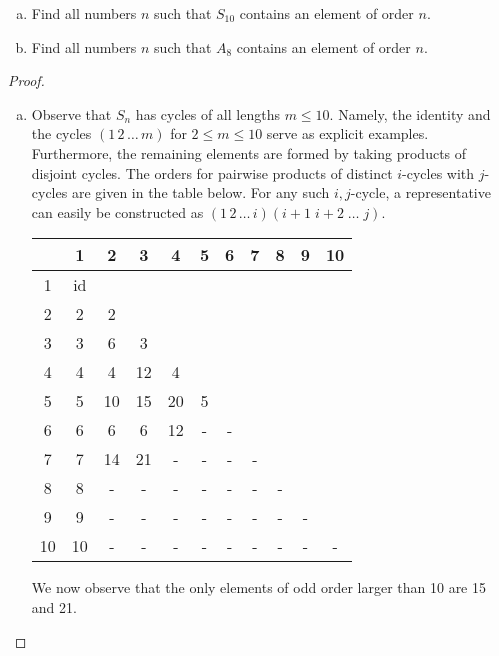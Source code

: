 \documentclass[10pt]{amsart}
\begin{document}
\begin{thm}
  \begin{enumerate}[(a)]
    \item
      Find all numbers $n$ such that $S_{10}$ contains an element of order $n$.
    \item
      Find all numbers $n$ such that $A_8$ contains an element of order $n$.
  \end{enumerate}
  \begin{proof}
    \begin{enumerate}[(a)]
    \item
      Observe that $S_n$ has cycles of all lengths $m \leq 10$.  
      Namely, the identity and the cycles $\left(1 \, 2 \, \ldots \, m\right)$ for $2 \leq m \leq 10$ serve as explicit examples.
      Furthermore, the remaining elements are formed by taking products of disjoint cycles.
      The orders for pairwise products of distinct $i$-cycles with $j$-cycles are given in the table below.
      For any such $i,j$-cycle, a representative can easily be constructed as $(1 \, 2 \, \ldots \, i)(i+1 \; i+2 \; \ldots \; j)$.
      \begin{center}
      \begin{tabular}{| c || c | c | c | c | c | c | c | c | c | c |}
        \hline
        & 1 & 2 & 3 & 4 & 5 & 6 & 7 & 8 & 9 & 10\\
        \hline
        \hline
        1 & id &  &  &  &  &  &  &  & &\\ 
        \hline
        2 & 2 & 2 &  &  &  &  &  &  & &\\ 
        \hline
        3 & 3 & 6 & 3 &  &  &  &  &  & &\\ 
        \hline
        4 & 4 & 4 & 12 & 4 &  &  &  &  & &\\ 
        \hline
        5 & 5 & 10 & 15 & 20 & 5 &  &  &  & &\\ 
        \hline
        6 & 6 & 6 & 6 & 12 & - & - &  &  & &\\ 
        \hline
        7 & 7 & 14 & 21 & - & - & - & - &  & &\\ 
        \hline
        8 & 8 & -  & - & - & - & - & - & - & & \\ 
        \hline
        9 & 9 & - & - & - & - & - & - & - & - & \\ 
        \hline
        10 & 10 & - & - & - & - & - & - & - & - & -\\
        \hline
      \end{tabular}
      \end{center}
      We now observe that the only elements of odd order larger than 10 are 15 and 21.

\end{enumerate}
\end{proof}
\end{thm}
\end{document}
